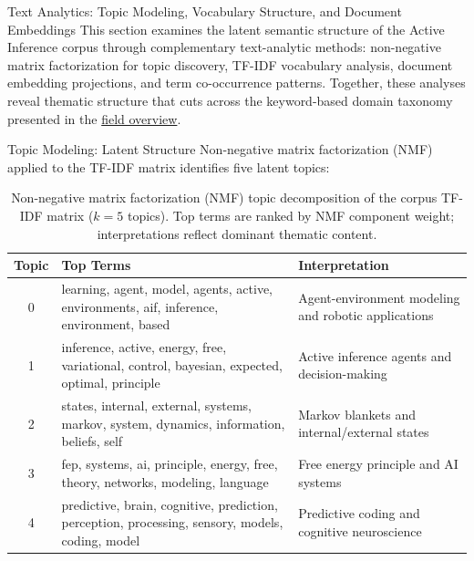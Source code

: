 \documentclass[
  ignorenonframetext,
]{beamer}
\author{\texorpdfstring{}{}}
\date{}
\begin{document}
\begin{frame}{Text Analytics: Topic Modeling, Vocabulary Structure, and
Document Embeddings \label{sec:text_analytics}}
\protect{}\label{text-analytics-topic-modeling-vocabulary-structure-and-document-embeddings}
This section examines the latent semantic structure of the Active
Inference corpus through complementary text-analytic methods:
non-negative matrix factorization for topic discovery, TF-IDF vocabulary
analysis, document embedding projections, and term co-occurrence
patterns. Together, these analyses reveal thematic structure that cuts
across the keyword-based domain taxonomy presented in the
\hyperref[sec:field_overview]{field overview}.

\begin{block}{Topic Modeling: Latent Structure}
\protect{}\label{topic-modeling-latent-structure}
Non-negative matrix factorization (NMF) applied to the TF-IDF matrix
identifies five latent topics:

\begin{table}[htbp]
\centering
\caption{Non-negative matrix factorization (NMF) topic decomposition of the corpus TF-IDF matrix ($k = 5$ topics). Top terms are ranked by NMF component weight; interpretations reflect dominant thematic content.}
\label{tab:nmf_topics}
\begin{tabular}{clp{6cm}}
\toprule
\textbf{Topic} & \textbf{Top Terms} & \textbf{Interpretation} \\
\midrule
0 & learning, agent, model, agents, active, environments, aif, inference, environment, based & Agent-environment modeling and robotic applications \\
1 & inference, active, energy, free, variational, control, bayesian, expected, optimal, principle & Active inference agents and decision-making \\
2 & states, internal, external, systems, markov, system, dynamics, information, beliefs, self & Markov blankets and internal/external states \\
3 & fep, systems, ai, principle, energy, free, theory, networks, modeling, language & Free energy principle and AI systems \\
4 & predictive, brain, cognitive, prediction, perception, processing, sensory, models, coding, model & Predictive coding and cognitive neuroscience \\
\bottomrule
\end{tabular}
\end{table}


\end{block}
\end{frame}
\end{document}
